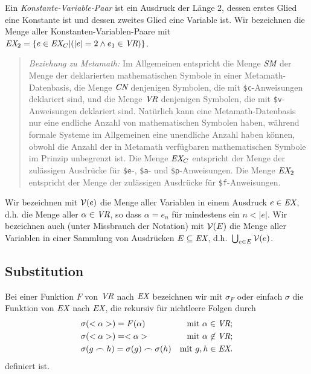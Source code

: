 Ein {\em Konstante-Variable-Paar} ist ein Ausdruck der Länge 2, dessen erstes Glied eine Konstante ist und dessen zweites Glied eine Variable ist.  Wir bezeichnen die Menge aller Konstanten-Variablen-Paare mit $\mbox{\em EX}_2 = \{ e \in \mbox{\em EX}_C | ( |e| = 2 \wedge e_1 \in \mbox{\em VR} ) \}$. 


{\footnotesize\begin{quotation}
{\em Beziehung zu Metamath:} Im Allgemeinen entspricht die Menge $\mbox{\em SM}$ der Menge der deklarierten mathematischen Symbole in einer Metamath-Datenbasis, die Menge $\mbox{\em CN}$ denjenigen Symbolen, die mit \texttt{\$c}-Anweisungen deklariert sind, und die Menge $\mbox{\em VR}$ denjenigen Symbolen, die mit \texttt{\$v}-Anweisungen deklariert sind.  Natürlich kann eine Metamath-Datenbasis nur eine endliche Anzahl von mathematischen Symbolen haben, während formale Systeme im Allgemeinen eine unendliche Anzahl haben können, obwohl die Anzahl der in Metamath verfügbaren mathematischen Symbole im Prinzip unbegrenzt ist.  Die Menge $\mbox{\em EX}_C$ entspricht der Menge der zulässigen Ausdrücke für \texttt{\$e}-, \texttt{\$a}- und \texttt{\$p}-Anweisungen.  Die Menge $\mbox{\em EX}_2$ entspricht der Menge der zulässigen Ausdrücke für \texttt{\$f}-Anweisungen.
\end{quotation}}

Wir bezeichnen mit ${\cal V}(e)$ die Menge aller Variablen in einem Ausdruck $e \in \mbox{\em EX}$, d.h. die Menge aller $\alpha \in \mbox{\em VR}$, so dass $\alpha = e_n$ für mindestens ein $n < |e|$.  Wir bezeichnen auch (unter Missbrauch der Notation) mit ${\cal V}(E)$ die Menge aller Variablen in einer Sammlung von Ausdrücken $E \subseteq \mbox{\em EX}$, d.h.\ $\bigcup _{e \in E} {\cal V}(e)$. 


\subsection{Substitution}

Bei einer Funktion $F$ von $\mbox{\em VR}$ nach $\mbox{\em EX}$ bezeichnen wir mit $\sigma_{F}$ oder einfach $\sigma$ die Funktion von $\mbox{\em EX}$ nach $\mbox{\em EX}$, die rekursiv für nichtleere Folgen durch 
\begin{eqnarray*}
& \sigma(<\alpha>) = F(\alpha) & \mbox{mit\ } \alpha \in \mbox{\em VR}; \\
& \sigma(<\alpha>) = <\alpha> & \mbox{mit\ } \alpha \not\in \mbox{\em VR}; \\
& \sigma(g \frown h) = \sigma(g) \frown
    \sigma(h) & \mbox{mit\ } g,h \in \mbox{\em EX}.
\end{eqnarray*}
definiert ist.

